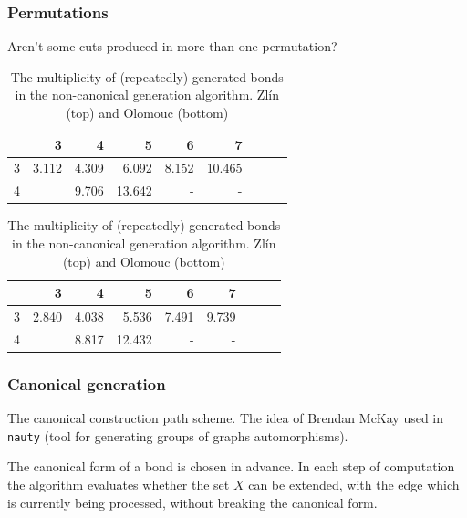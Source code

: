 \documentclass[10pt]{beamer}
\newcommand{\labelkm}{\scriptsize \diagbox[width=13pt,height=15pt]
        {\raisebox{-0pt}{k}}{ \raisebox{1pt}{m} } }
\newcommand{\evenrowcolor}{\rowcolor[gray]{0.925}}
\begin{document}


\begin{frame}
	\frametitle{Permutations}

	Aren't some cuts produced in more than one permutation?

\begin{table}[H]
        \caption{The multiplicity of (repeatedly) generated bonds in the
        non-canonical generation algorithm.
         Zlín (top) and Olomouc (bottom)}
        \label{tab:repeated-canonical}
    \centering
        \begin{tabular}{c|rrrrrrrr}

    \hline

    \labelkm  &        3 &         4 &         5 &         6 &        7 \\[2pt]
    \hline
           3  &    3.112 &     4.309 &     6.092 &     8.152 &   10.465 \\
    \evenrowcolor
           4  &          &     9.706 &    13.642 &         - &        - \\

        \end{tabular}
{\vskip 3mm}
        \begin{tabular}{c|rrrrrrrr}

    \hline

     \labelkm &        3 &         4 &         5 &         6 &      7 \\[2pt]
    \hline
           3  &    2.840 &     4.038 &     5.536 &     7.491 &   9.739 \\
    \evenrowcolor
           4  &          &     8.817 &    12.432 &         - &      -  \\

        \end{tabular}
\end{table}


\end{frame}

\begin{frame}
	\frametitle{Canonical generation}

	The canonical construction path scheme. The idea of Brendan McKay used in {\tt nauty} (tool for generating groups of graphs automorphisms).

	\bigskip

	The canonical form of a bond is chosen in advance. In each step of computation the algorithm evaluates whether the set $X$ can be extended, with the edge which is currently being processed, without breaking the canonical form.

\end{frame}
\end{document}

